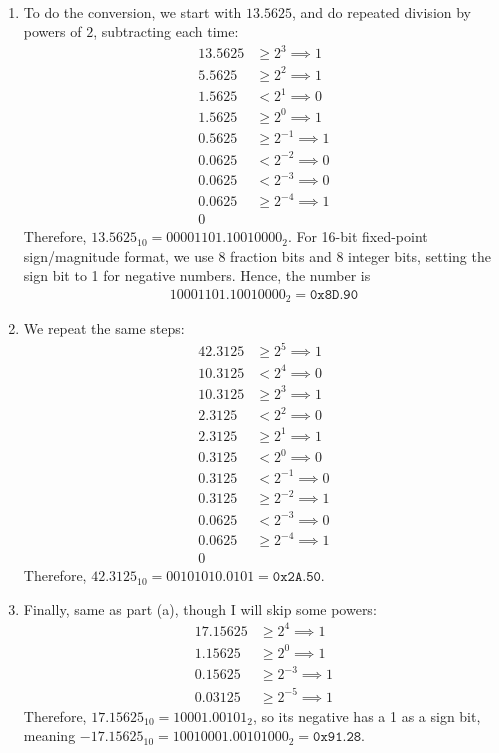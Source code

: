 \documentclass[12pt]{article}
\newenvironment{sol}[1][Solution]{\begin{trivlist}
		\item[\hskip \labelsep {\bfseries #1:}]}{\end{trivlist}}
\begin{document}
\begin{sol}
	\
	\begin{enumerate}[label=(\alph*)]
		\item To do the conversion, we start with $13.5625$, and do repeated division
		by powers of $2$, subtracting each time:
		\begin{align*}
			13.5625&\geq 2^{3}\implies 1\\
			5.5625&\geq 2^{2}\implies 1\\
			1.5625&< 2^{1}\implies  0\\
			1.5625&\geq 2^{0} \implies 1\\
			0.5625&\geq 2^{-1}\implies 1\\
			0.0625& < 2^{-2}\implies 0\\
			0.0625&<2^{-3}\implies 0\\
			0.0625&\geq 2^{-4} \implies 1\\
			0&
		\end{align*}
		Therefore, $13.5625_{10}=0000 1101.10010000 _2$. 
		For 16-bit fixed-point sign/magnitude format, we use 8 fraction bits and 8
		integer bits, setting the sign bit to 1 for negative numbers. Hence, the number is
		\begin{align*}
			1000 1101.1001 0000_2=\texttt{0x8D.90}
		\end{align*}
		\item We repeat the same steps:
		\begin{align*}
			42.3125&\geq 2^{5}\implies 1\\
			10.3125& < 2^{4}\implies 0\\
			10.3125&\geq 2^{3}\implies 1\\
			2.3125&< 2^{2}\implies 0\\
			2.3125&\geq 2^{1}\implies 1\\
			0.3125&< 2^{0}\implies 0\\
			0.3125& < 2^{-1}\implies 0\\
			0.3125&\geq 2^{-2}\implies 1\\
			0.0625&<2^{-3}\implies 0\\
			0.0625&\geq 2^{-4}\implies 1\\
			0&
		\end{align*}
		Therefore, $42.3125_{10}=0010 1010.0101=\texttt{0x2A.50}$.
		\item Finally, same as part (a), though I will skip some powers:
		\begin{align*}
			17.15625&\geq 2^{4}\implies 1\\
			1.15625&\geq 2^{0}\implies 1\\
			0.15625&\geq 2^{-3}\implies 1\\
			0.03125&\geq 2^{-5}\implies 1
		\end{align*}
		Therefore, $17.15625_{10}=10001.00101_2$, so its negative has a 1 as a sign bit,
		meaning $-17.15625_{10}=1001 0001.0010 1000_2=\texttt{0x91.28}$.
	\end{enumerate}
\end{sol}
\end{document}
